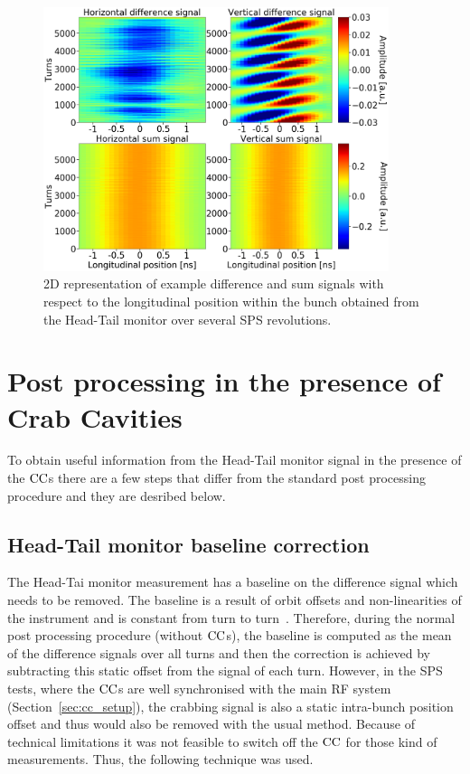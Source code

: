 \begin{figure}[!h]
   \centering         
   \includegraphics[width=0.9\textwidth]{images/Ch4/HT_2D__20180530_135105_colorbar_new_version.png}
       \caption{2D representation of example difference and sum signals with respect to the longitudinal position within the bunch obtained from the Head-Tail monitor over several SPS revolutions.}
       \label{fig:HT_example_signals_2D}
\end{figure}


\section{Post processing in the presence of Crab Cavities}\label{subsec:HT_post_process_CC}
To obtain useful information from the Head-Tail monitor signal in the presence of the ${\mathrm{CC}}$s there are a few steps that differ from the standard post processing procedure and they are desribed below.

\subsection{Head-Tail monitor baseline correction}\label{subsec:HT_baseline_correction}
The Head-Tai monitor measurement has a baseline on the difference signal which needs to be removed. The baseline is a result of orbit offsets and non-linearities of the instrument and is constant from turn to turn~\cite{Levens:2313358}. Therefore, during the normal post processing procedure (without ${\mathrm{CC}}$s), the baseline is computed as the mean of the difference signals over all turns and then the correction is achieved by subtracting this static offset from the signal of each turn. However, in the SPS tests, where the ${\mathrm{CC}}$s are well synchronised with the main RF system (Section~\ref{sec:cc_setup}), the crabbing signal is also a static intra-bunch position offset and thus would also be removed with the usual method. Because of technical limitations it was not feasible to switch off the ${\mathrm{CC}}$ for those kind of measurements. Thus, the following technique was used. 

